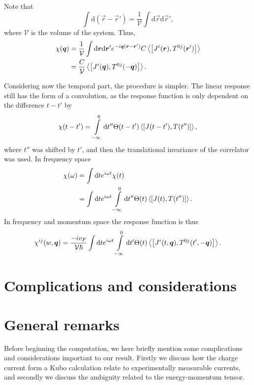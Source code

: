 Note that
\begin{equation}
  \int \mathrm{d}(\vec{r} - \vec{r}') = \frac{1}{\mathcal{V}} \int \mathrm{d}\vec{r} \mathrm{d} \vec{r}',
\end{equation}
where $\mathcal{V}$ is the volume of the system.
Thus,
\begin{equation}
  \begin{split}
    \chi (\vec{q}) &= \frac{1}{\mathcal{V}} \int \mathrm{d}\vec{r} \mathrm{d}\vec{r}'
    e^{-i\vec{q}(\vec{r}-\vec{r}')}
    C \Braket{\left[
        J^i(\vec{r}), T^{0j}(\vec{r}')
      \right]}\\
    &= \frac{C}{\mathcal{V}} \Braket{\left[ J^i(\vec{q}), T^{0j}(-\vec{q}) \right]}.
  \end{split}
\end{equation}

Considering now the temporal part, the procedure is simpler.
The linear response still has the form of a convolution, as the response function is only dependent on the difference $t-t'$ by
\begin{equation}
  \chi (t-t') = \int\limits_{-\infty }^0 \mathrm{d} t'' \Theta (t - t')
  \Braket{\left[ J(t-t'), T(t'') \right]},
\end{equation}
where $t''$ was shifted by $t' $, and then the translational invariance of the correlator was used.
In frequency space
\begin{align}
  \chi (\omega ) &= \int \mathrm{d} t e^{i \omega  t} \chi (t)\\
                 &= \int \mathrm{d} t e^{i \omega  t} \int\limits_{-\infty  }^0 \mathrm{d} t''
                   \Theta (t) \Braket{\left[ J(t), T(t'') \right]}.
\end{align}
In frequency and momentum space the response function is thus
\begin{equation}\label{eq:22}
  \chi ^{ij} (w, \vec{q}) =
  \frac{-iv_F}{\mathcal{V} \hbar }
  \int \mathrm{d}t e^{i\omega t}
  \int\limits_{-\infty }^{0} \mathrm{d}t'
  \Theta (t)
  \Braket{\left[
      J^i(t, \vec{q}), T^{0j}(t', -\vec{q})
    \right]}.
\end{equation}

\section{Complications and considerations}
\section{General remarks}
Before beginning the computation, we here briefly mention some complications and considerations important to our result.
Firstly we discuss how the charge current form a Kubo calculation relate to experimentally measurable currents, and secondly we discuss the ambiguity related to the energy-momentum tensor.

